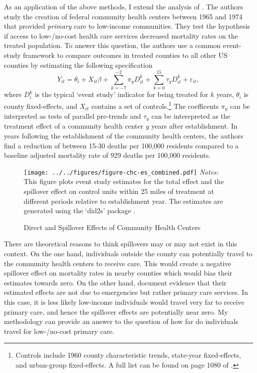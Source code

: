 \documentclass[11pt]{article}
\begin{document}
As an application of the above methods, I extend the analysis of \citet{Bailey_Goodman_Bacon_2015}. The authors study the creation of federal community health centers between 1965 and 1974 that provided \textit{primary} care to low-income communities. They test the hypothesis if access to low-/no-cost health care services decreased mortality rates on the treated population. To answer this question, the authors use a common event-study framework to compare outcomes in treated counties to all other US counties by estimating the following specification 
\begin{equation}\label{eq:chc_es}
    Y_{it} = \theta_i + X_{it} \beta + \sum_{k = -7}^{-2} \pi_y D_{it}^k + \sum_{k = 0}^{15} \tau_{y} D_{it}^k + \varepsilon_{it},
\end{equation}
where $D_i^k$ is the typical `event study' indicator for being treated for $k$ years, $\theta_i$ is county fixed-effects, and $X_{it}$ contains a set of controls.\footnote{Controls include 1960 county characteristic trends, state-year fixed-effects, and urban-group fixed-effects. A full list can be found on page 1080 of \citet{Bailey_Goodman_Bacon_2015}.} The coefficents $\pi_y$ can be interpreted as tests of parallel pre-trends and $\tau_y$ can be interepreted as the treatment effect of a community health center $y$ years after establishment. In years following the establishment of the community health centers, the authors find a reduction of between 15-30 deaths per 100,000 residents compared to a baseline adjusted mortality rate of 929 deaths per 100,000 residents. 

\begin{figure}[tb!]
    \caption{Direct and Spillover Effects of Community Health Centers}
    \label{fig:chc_es_spill}
        
    {\centering
        \texttt{[image: ../../figures/figure-chc-es\_combined.pdf]}
    }
    {\footnotesize
        \textit{Notes:} This figure plots event study estimates for the total effect and the spillover effect on control units within 25 miles of treatment at different periods relative to establishment year. The estimates are generated using the `did2s' package \citep{did2s}. 
    }
\end{figure}


There are theoretical reasons to think spillovers may or may not exist in this context. On the one hand, individuals outside the county can potentially travel to the community health centers to receive care. This would create a negative spillover effect on mortality rates in nearby counties which would bias their estimates towards zero. On the other hand, \citet{Bailey_Goodman_Bacon_2015} document evidence that their estimated effects are not due to emergencies but rather primary care services. In this case, it is less likely low-income individuals would travel very far to receive primary care, and hence the spillover effects are potentially near zero. My methodology can provide an answer to the question of how far do individuals travel for low-/no-cost primary care.
\end{document}
